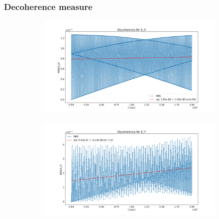 \documentclass{beamer}
\begin{document}
\begin{frame}\frametitle{Decoherence measure}
  \begin{figure}[H]
    \centering
    \begin{subfigure}[t]{\textwidth}\centering
      \includegraphics[height=.4\paperheight, trim=85 25 120 55, clip]{SX_decoh_20sec_unopt}
    \end{subfigure}

    \begin{subfigure}[t]{\textwidth}\centering
      \includegraphics[height=.4\paperheight, trim=85 25 120 55, clip]{SY_decoh_20sec_unopt}
    \end{subfigure}
  \end{figure}
\end{frame}
\end{document}
